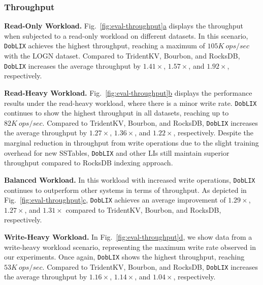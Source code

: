 \subsubsection{\textbf{Throughput}}
\label{sec:eval:throughput}
{\small\textbf{Read-Only Workload.}} Fig.~\hyperref[fig:eval-throughput]{\ref*{fig:eval-throughput}a} displays the throughput when subjected to a read-only workload on different datasets. In this scenario, \texttt{DobLIX} achieves the highest throughput, reaching a maximum of $105K~ops/sec$ with the LOGN dataset. Compared to TridentKV, Bourbon, and RocksDB, \texttt{DobLIX} increases the average throughput by $1.41\times$, $1.57\times$, and $1.92\times$, respectively. 

\vspace{1pt}
\noindent
{\small\textbf{Read-Heavy Workload.}} Fig.~\hyperref[fig:eval-throughput]{\ref*{fig:eval-throughput}b} displays the performance results under the read-heavy workload, where there is a minor write rate. \texttt{DobLIX} continues to show the highest throughput in all datasets, reaching up to $82K~ops/sec$.
Compared to TridentKV, Bourbon, and RocksDB, \texttt{DobLIX} increases the average throughput by $1.27\times$, $1.36\times$, and $1.22\times$, respectively. Despite the marginal reduction in throughput from write operations due to the slight training overhead for new SSTables, \texttt{DobLIX} and other LIs still maintain superior throughput compared to RocksDB indexing approach.

\vspace{1pt}
\noindent
{\small\textbf{Balanced Workload.}} In this workload with increased write operations, \texttt{DobLIX} continues to outperform other systems in terms of throughput. As depicted in Fig.~\hyperref[fig:eval-throughput]{\ref*{fig:eval-throughput}c}, \texttt{DobLIX} achieves an average improvement of $1.29\times$, $1.27\times$, and $1.31\times$ compared to TridentKV, Bourbon, and RocksDB, respectively. 

\vspace{1pt}
\noindent
{\small\textbf{Write-Heavy Workload.}} In Fig.~\hyperref[fig:eval-throughput]{\ref*{fig:eval-throughput}d}, we show data from a write-heavy workload scenario, representing the maximum write rate observed in our experiments. Once again, \texttt{DobLIX} shows the highest throughput, reaching $53K~ops/sec$.
Compared to TridentKV, Bourbon, and RocksDB, \texttt{DobLIX} increases the average throughput by $1.16\times$, $1.14\times$, and $1.04\times$, respectively. 


